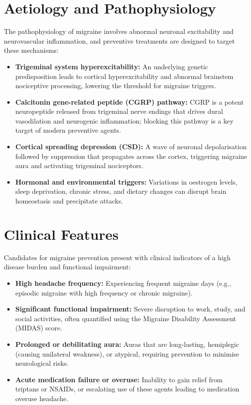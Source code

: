 \section*{Aetiology and Pathophysiology}
The pathophysiology of migraine involves abnormal neuronal excitability and neurovascular inflammation, and preventive treatments are designed to target these mechanisms:
\begin{itemize}
    \item \textbf{Trigeminal system hyperexcitability:} An underlying genetic predisposition leads to cortical hyperexcitability and abnormal brainstem nociceptive processing, lowering the threshold for migraine triggers.
    \item \textbf{Calcitonin gene-related peptide (CGRP) pathway:} CGRP is a potent neuropeptide released from trigeminal nerve endings that drives dural vasodilation and neurogenic inflammation; blocking this pathway is a key target of modern preventive agents.
    \item \textbf{Cortical spreading depression (CSD):} A wave of neuronal depolarisation followed by suppression that propagates across the cortex, triggering migraine aura and activating trigeminal nociceptors.
    \item \textbf{Hormonal and environmental triggers:} Variations in oestrogen levels, sleep deprivation, chronic stress, and dietary changes can disrupt brain homeostasis and precipitate attacks.
\end{itemize}

\section*{Clinical Features}
Candidates for migraine prevention present with clinical indicators of a high disease burden and functional impairment:
\begin{itemize}
    \item \textbf{High headache frequency:} Experiencing frequent migraine days (e.g., episodic migraine with high frequency or chronic migraine).
    \item \textbf{Significant functional impairment:} Severe disruption to work, study, and social activities, often quantified using the Migraine Disability Assessment (MIDAS) score.
    \item \textbf{Prolonged or debilitating aura:} Auras that are long-lasting, hemiplegic (causing unilateral weakness), or atypical, requiring prevention to minimise neurological risks.
    \item \textbf{Acute medication failure or overuse:} Inability to gain relief from triptans or NSAIDs, or escalating use of these agents leading to medication overuse headache.
\end{itemize}

